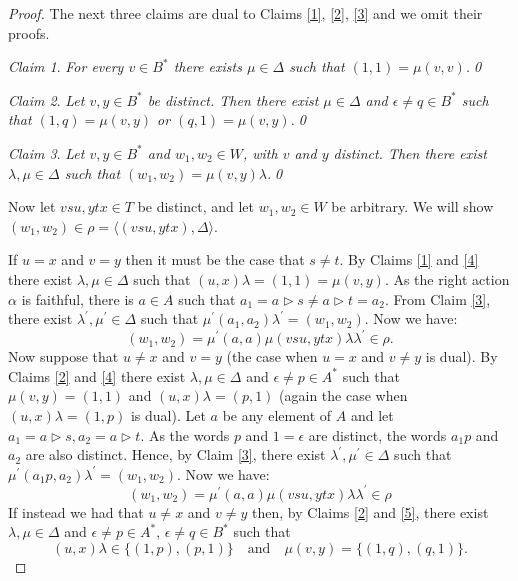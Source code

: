 \documentclass[a4paper, 12pt,reqno]{amsart}
\theoremstyle{plain}
\theoremstyle{definition}
\theoremstyle{remark}
\newtheorem{cclaim}{Claim}[thm]
\newenvironment{claim}{\begin{cclaim}\it}{\end{cclaim}}
\begin{document}
\begin{proof}
       The next three claims are dual to Claims \ref{1}, \ref{2}, \ref{3} and we omit their proofs.


    \begin{claim}
        \label{4}
        For every $v\in B^\ast$ there exists $\mu \in \Delta$ such that $(1,1) = \mu (v,v)$.\qed
    \end{claim}

    \begin{claim}
        \label{5}
        Let $v , y\in B^\ast$ be distinct.
        Then there exist $\mu \in \Delta$ and $\epsilon\neq q \in B^\ast$ such that $(1,q) = \mu (v,y)$ or $(q,1) = \mu (v,y)$.\qed
    \end{claim}

    \begin{claim}
        \label{6}
        Let $v,y\in B^\ast$ and $w_1,w_2\in W$, with $v$ and $y$ distinct.
        Then there exist $\lambda,\mu \in \Delta$ such that $(w_1,w_2) = \mu (v,y) \lambda$.\qed
    \end{claim}

 
    Now let $vsu,ytx \in T$ be distinct, and let $w_1,w_2 \in W$ be arbitrary.
    We will show $(w_1,w_2) \in \rho = \bigl\langle (vsu,ytx), \Delta \bigr\rangle$. 

    If $u = x$ and $v = y$ then it must be the case that $s \neq t$. 
    By Claims \ref{1} and \ref{4} there exist $\lambda, \mu \in \Delta$ such that $(u,x)\lambda = (1,1) = \mu (v,y)$.
    As the right action $\alpha$ is faithful, there is $a \in A$ such that $a_1 = a \triangleright s \neq a \triangleright t = a_2$.
    From Claim \ref{3}, there exist $\lambda^\prime , \mu^\prime \in \Delta$ such that $\mu^\prime (a_1,a_2) \lambda^\prime = (w_1,w_2)$.
    Now we have:
    \begin{equation*}
        (w_1,w_2) = \mu^\prime (a,a) \mu(vsu,ytx)\lambda \lambda^\prime \in \rho.
    \end{equation*}
    Now suppose that $u \neq x$ and $v = y$ (the case when $u = x$ and $v \neq y$ is dual). 
    By Claims \ref{2} and \ref{4} there exist $\lambda , \mu \in \Delta$ and $\epsilon\neq p\in A^\ast$ such that $\mu (v,y) = (1,1)$ and $(u,x) \lambda = (p,1)$ (again the case when $(u,x) \lambda = (1,p)$ is dual).
    Let $a$ be any element of $A$ and let $a_1 = a \triangleright s, a_2 = a \triangleright t$.
    As the words $p$ and $1 = \epsilon$ are distinct, the words $a_1 p$ and $a_2$ are also distinct.
    Hence, by Claim \ref{3}, there exist $\lambda^\prime , \mu^\prime \in \Delta$ such that $\mu^\prime (a_1 p ,a_2) \lambda^\prime = (w_1,w_2)$.
    Now we have:
    \begin{equation*}
        (w_1,w_2) = \mu^\prime (a,a) \mu (vsu,ytx) \lambda \lambda^\prime \in \rho
    \end{equation*}
    If instead we had that $u \neq x$ and $v \neq y$ then, by Claims \ref{2} and \ref{5}, there exist 
    ${\lambda,\mu \in \Delta}$ and $\epsilon\neq p \in A^\ast$, $\epsilon\neq q \in B^\ast$ such that 
    \[
    (u,x) \lambda \in\bigl\{ (1,p),(p,1)\bigr\}\quad\text{and}\quad \mu (v,y) = \bigl\{ (1,q),(q,1)\bigr\}.
    \]


\end{proof}
\end{document}
